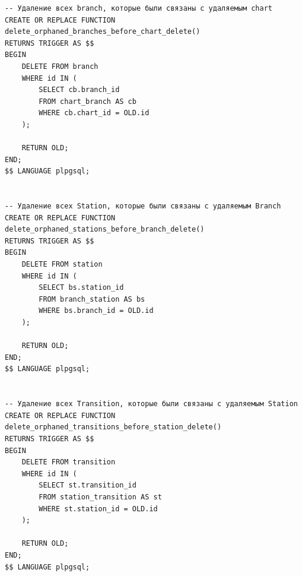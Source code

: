 \begin{lstlisting}[label=lst:del:tr:funcs,caption=Реализация удаляющих триггерных функций,firstnumber=1]
-- Удаление всех branch, которые были связаны с удаляемым chart
CREATE OR REPLACE FUNCTION delete_orphaned_branches_before_chart_delete()
RETURNS TRIGGER AS $$
BEGIN
    DELETE FROM branch
    WHERE id IN (
        SELECT cb.branch_id
        FROM chart_branch AS cb
        WHERE cb.chart_id = OLD.id
    );
    
    RETURN OLD;
END;
$$ LANGUAGE plpgsql;


-- Удаление всех Station, которые были связаны с удаляемым Branch
CREATE OR REPLACE FUNCTION delete_orphaned_stations_before_branch_delete()
RETURNS TRIGGER AS $$
BEGIN
    DELETE FROM station
    WHERE id IN (
        SELECT bs.station_id
        FROM branch_station AS bs
        WHERE bs.branch_id = OLD.id
    );
    
    RETURN OLD;
END;
$$ LANGUAGE plpgsql;


-- Удаление всех Transition, которые были связаны с удаляемым Station
CREATE OR REPLACE FUNCTION delete_orphaned_transitions_before_station_delete()
RETURNS TRIGGER AS $$
BEGIN
    DELETE FROM transition
    WHERE id IN (
        SELECT st.transition_id
        FROM station_transition AS st
        WHERE st.station_id = OLD.id
    );
    
    RETURN OLD;
END;
$$ LANGUAGE plpgsql;
\end{lstlisting}

\clearpage
